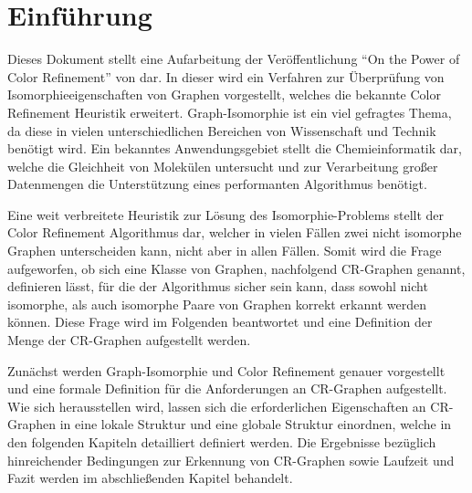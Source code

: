 \section{Einführung}
\label{sec/einfuehrung}

Dieses Dokument stellt eine Aufarbeitung der Veröffentlichung \enquote{On the Power of Color Refinement} von \cite{Arvind2015} dar.
In dieser wird ein Verfahren zur Überprüfung von Isomorphieeigenschaften von Graphen vorgestellt, welches die bekannte Color Refinement Heuristik erweitert.
Graph-Isomorphie ist ein viel gefragtes Thema, da diese in vielen unterschiedlichen Bereichen von Wissenschaft und Technik benötigt wird.
Ein bekanntes Anwendungsgebiet stellt die Chemieinformatik dar, welche die Gleichheit von Molekülen untersucht und zur Verarbeitung großer Datenmengen die Unterstützung eines performanten Algorithmus benötigt.

Eine weit verbreitete Heuristik zur Lösung des Isomorphie-Problems stellt der Color Refinement Algorithmus dar, welcher in vielen Fällen zwei nicht isomorphe Graphen unterscheiden kann, nicht aber in allen Fällen.
Somit wird die Frage aufgeworfen, ob sich eine Klasse von Graphen, nachfolgend CR-Graphen genannt, definieren lässt, für die der Algorithmus sicher sein kann, dass sowohl nicht isomorphe, als auch isomorphe Paare von Graphen korrekt erkannt werden können.
Diese Frage wird im Folgenden beantwortet und eine Definition der Menge der CR-Graphen aufgestellt werden.

Zunächst werden Graph-Isomorphie und Color Refinement genauer vorgestellt und eine formale Definition für die Anforderungen an CR-Graphen aufgestellt.
Wie sich herausstellen wird, lassen sich die erforderlichen Eigenschaften an CR-Graphen in eine lokale Struktur und eine globale Struktur einordnen, welche in den folgenden Kapiteln detailliert definiert werden.
Die Ergebnisse bezüglich hinreichender Bedingungen zur Erkennung von CR-Graphen sowie Laufzeit und Fazit werden im abschließenden Kapitel behandelt.